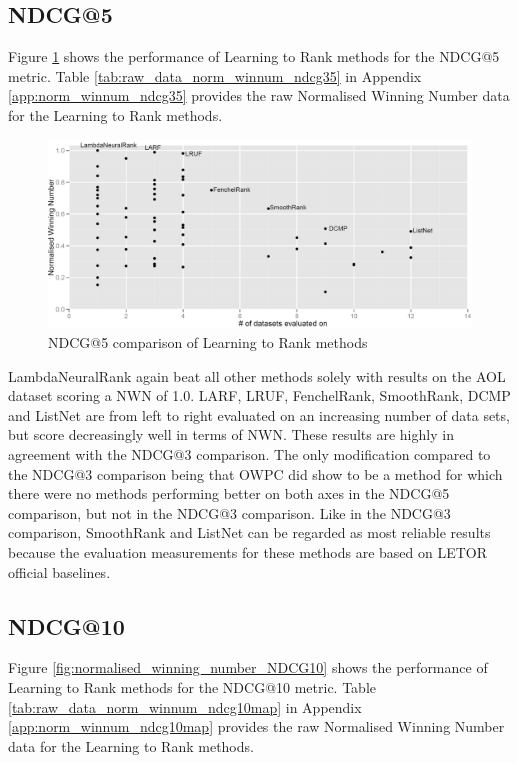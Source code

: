 \subsection{NDCG@5}
Figure \ref{fig:normalised_winning_number_NDCG5} shows the performance of Learning to Rank methods for the \ac{NDCG}@5 metric. Table \ref{tab:raw_data_norm_winnum_ndcg35} in Appendix \ref{app:norm_winnum_ndcg35} provides the raw Normalised Winning Number data for the Learning to Rank methods.\\

\begin{figure}[!h]
\centering
\includegraphics[scale=0.35]{gfx/ndcg5_winnum}
\caption{\acs{NDCG}@5 comparison of Learning to Rank methods}
\label{fig:normalised_winning_number_NDCG5}
\end{figure}

LambdaNeuralRank again beat all other methods solely with results on the AOL dataset scoring a \ac{NWN} of 1.0. LARF, LRUF, FenchelRank, SmoothRank, DCMP and ListNet are from left to right evaluated on an increasing number of data sets, but score decreasingly well in terms of \ac{NWN}. These results are highly in agreement with the \ac{NDCG}@3 comparison. The only modification compared to the \ac{NDCG}@3 comparison being that OWPC did show to be a method for which there were no methods performing better on both axes in the \ac{NDCG}@5 comparison, but not in the \ac{NDCG}@3 comparison. Like in the \ac{NDCG}@3 comparison, SmoothRank and ListNet can be regarded as most reliable results because the evaluation measurements for these methods are based on LETOR official baselines.

\subsection{NDCG@10}
Figure \ref{fig:normalised_winning_number_NDCG10} shows the performance of Learning to Rank methods for the \ac{NDCG}@10 metric. Table \ref{tab:raw_data_norm_winnum_ndcg10map} in Appendix \ref{app:norm_winnum_ndcg10map} provides the raw Normalised Winning Number data for the Learning to Rank methods.\\


